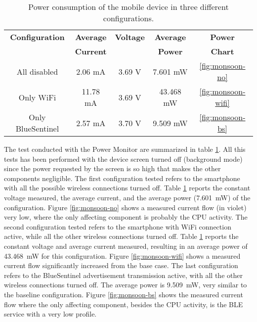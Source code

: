 \begin{table}[h!tb]
\center
\caption{Power consumption of the mobile device in three different configurations.}
\label{tab:monsoon}
\begin{tabular}{|c|c|c|c|c|}
  \hline
  \textbf{Configuration} & \textbf{Average} & \textbf{Voltage} & \textbf{Average} & \textbf{Power}\\
   & \textbf{Current} &  & \textbf{ Power} & \textbf{Chart}\\
  \hline
  All disabled & 2.06 mA & 3.69 V & 7.601 mW & \ref{fig:monsoon-no} \\
  Only WiFi & 11.78 mA & 3.69 V & 43.468 mW & \ref{fig:monsoon-wifi} \\
  Only BlueSentinel & 2.57 mA & 3.70 V & 9.509 mW & \ref{fig:monsoon-bs} \\
  \hline
\end{tabular}
\end{table}

The test conducted with the Power Monitor are summarized in table \ref{tab:monsoon}. All this tests has been performed with the device screen turned off (background mode) since the power requested by the screen is so high that makes the other components negligible. The first configuration tested refers to the smartphone with all the possible wireless connections turned off. Table \ref{tab:monsoon} reports the constant voltage measured, the average current, and the average power (7.601~mW) of the configuration. Figure \ref{fig:monsoon-no} shows a measured current flow (in violet) very low, where the only affecting component is probably the CPU activity.
The second configuration tested refers to the smartphone with WiFi connection active, while all the other wireless connections turned off. Table \ref{tab:monsoon} reports the constant voltage and average current measured, resulting in an average power of 43.468~mW for this configuration. Figure \ref{fig:monsoon-wifi} shows a measured current flow significantly increased from the base case. The last configuration refers to the BlueSentinel advertisement transmission active, with all the other wireless connections turned off. The average power is 9.509~mW, very similar to the baseline configuration. Figure \ref{fig:monsoon-bs} shows the measured current flow where the only affecting component, besides the CPU activity, is the BLE service with a very low profile.

